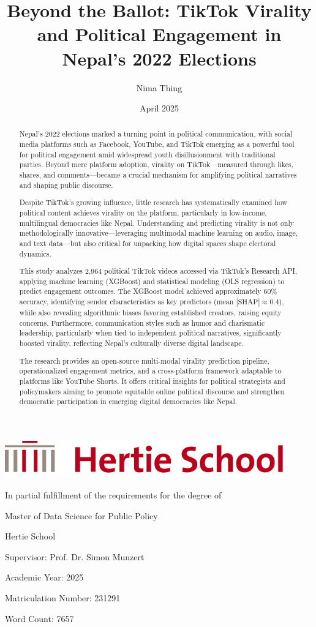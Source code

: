 \documentclass[12pt,a4paper]{report}
\title{Beyond the Ballot: TikTok Virality and Political Engagement in Nepal's 2022 Elections}
\author{Nima Thing}
\date{April 2025}
\makeatletter
\renewcommand{\maketitle}{
\begin{titlepage}
\thispagestyle{empty}
\onehalfspacing
\setlength{\parskip}{0.5em}
\setlength{\parindent}{0pt}

\begin{minipage}{0.3\textwidth}
\raggedleft
\vspace*{1cm}
\includegraphics[width=0.9\textwidth]{figures/hertie_logo.png}
\end{minipage}

\begin{center}
\vspace*{2cm}
{\Large\bfseries\@title \par} %
\vspace{1.5cm}

{\normalsize\@author \par} %
\vspace{1cm}

{\normalsize In partial fulfillment of the requirements for the degree of \par}
{\normalsize Master of Data Science for Public Policy \par}
\vspace{0.5cm}

{\normalsize Hertie School \par}
\vspace{0.5cm}

{\normalsize Supervisor: Prof. Dr. Simon Munzert \par}
\vspace{0.5cm}

{\normalsize Academic Year: 2025 \par}
\vspace{0.5cm}

{\normalsize Matriculation Number: 231291 \par}
\vspace{0.5cm}

{\normalsize Word Count: 7657  \par}
\vspace{0.5cm}

{\normalsize\@date \par}
\vspace{1cm}

\end{center}
\end{titlepage}
}
\makeatother
\begin{document}

\maketitle


\begin{abstract}
Nepal’s 2022 elections marked a turning point in political communication, with social media platforms such as Facebook, YouTube, and TikTok emerging as a powerful tool for political engagement amid widespread youth disillusionment with traditional parties. Beyond mere platform adoption, virality on TikTok—measured through likes, shares, and comments—became a crucial mechanism for amplifying political narratives and shaping public discourse. 

Despite TikTok’s growing influence, little research has systematically examined how political content achieves virality on the platform, particularly in low-income, multilingual democracies like Nepal. Understanding and predicting virality is not only methodologically innovative—leveraging multimodal machine learning on audio, image, and text data—but also critical for unpacking how digital spaces shape electoral dynamics.

This study analyzes 2,964 political TikTok videos accessed via TikTok’s Research API, applying machine learning (XGBoost) and statistical modeling (OLS regression) to predict engagement outcomes. The XGBoost model achieved approximately 60\% accuracy, identifying sender characteristics as key predictors (mean $|\text{SHAP}| \approx 0.4$), while also revealing algorithmic biases favoring established creators, raising equity concerns. Furthermore, communication styles such as humor and charismatic leadership, particularly when tied to independent political narratives, significantly boosted virality, reflecting Nepal’s culturally diverse digital landscape.

The research provides an open-source multi-modal virality prediction pipeline, operationalized engagement metrics, and a cross-platform framework adaptable to platforms like YouTube Shorts. It offers critical insights for political strategists and policymakers aiming to promote equitable online political discourse and strengthen democratic participation in emerging digital democracies like Nepal.
\end{abstract}
\end{document}
